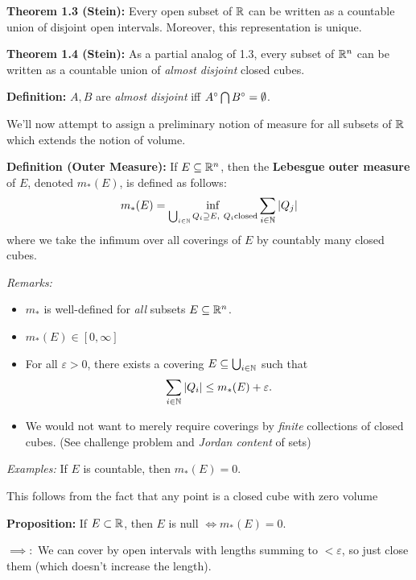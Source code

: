 \textbf{Theorem 1.3 (Stein):} Every open subset of \({\mathbb{R}}\) can be
written as a countable union of disjoint open intervals. Moreover, this
representation is unique.

\textbf{Theorem 1.4 (Stein):} As a partial analog of 1.3, every subset
of \({\mathbb{R}}^n\) can be written as a countable union of \emph{almost
disjoint} closed cubes.

\textbf{Definition:} \(A, B\) are \emph{almost disjoint} iff
\(A^\circ \bigcap B^\circ = \emptyset\).

We'll now attempt to assign a preliminary notion of measure for all
subsets of \({\mathbb{R}}\) which extends the notion of volume.

\textbf{Definition (Outer Measure):} If \(E \subseteq {\mathbb{R}}^n\), then the
\textbf{Lebesgue outer measure} of \(E\), denoted \(m_*(E)\), is defined
as follows:
\begin{align*}
m_*(E) = \inf_{\bigcup_{i\in{\mathbb{N}}} Q_i \supseteq E, ~ Q_i \text{closed}} \sum_{i\in{\mathbb{N}}} {\left\lvert {Q_j} \right\rvert}
\end{align*} where we take the infimum over all coverings of \(E\) by
countably many closed cubes.

\emph{Remarks:}

\begin{itemize}
\item
  \(m_*\) is well-defined for \emph{all} subsets \(E \subseteq {\mathbb{R}}^n\).
\item
  \(m_*(E) \in [0, \infty]\)
\item
  For all \(\varepsilon > 0\), there exists a covering
  \(E \subseteq \bigcup_{i\in {\mathbb{N}}}\) such that
  \begin{align*}
  \sum_{i\in{\mathbb{N}}} {\left\lvert {Q_i} \right\rvert} \leq m_*(E) + \varepsilon
  .\end{align*}
\item
  We would not want to merely require coverings by \emph{finite}
  collections of closed cubes. (See challenge problem and \emph{Jordan
  content} of sets)
\end{itemize}

\emph{Examples:} If \(E\) is countable, then \(m_*(E) = 0\).

This follows from the fact that any point is a closed cube with zero
volume

\textbf{Proposition:} If \(E \subset {\mathbb{R}}\), then \(E\) is null
\(\iff m_*(E) = 0\).

\(\implies:\) We can cover by open intervals with lengths summing to
\(<\varepsilon\), so just close them (which doesn't increase the
length).

